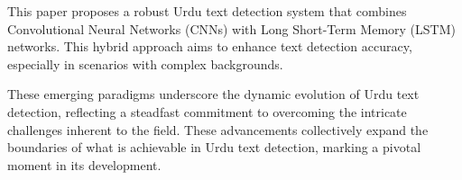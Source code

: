 This paper proposes a robust Urdu text detection system that combines Convolutional Neural Networks (CNNs) with Long Short-Term Memory (LSTM) networks. This hybrid approach aims to enhance text detection accuracy, especially in scenarios with complex backgrounds.

These emerging paradigms underscore the dynamic evolution of Urdu text detection, reflecting a steadfast commitment to overcoming the intricate challenges inherent to the field. These advancements collectively expand the boundaries of what is achievable in Urdu text detection, marking a pivotal moment in its development.

